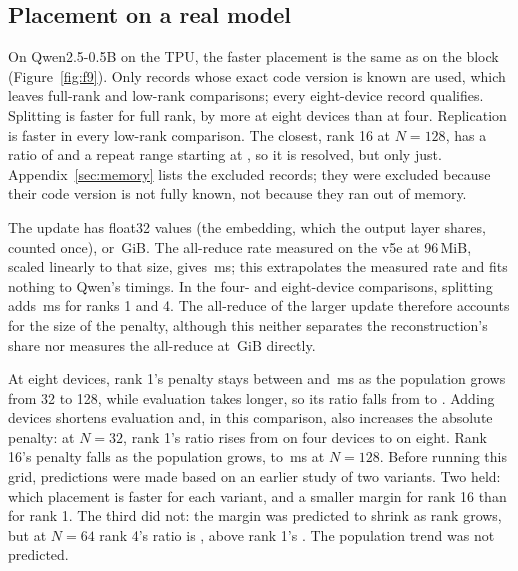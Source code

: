 \subsection{Placement on a real model}



On Qwen2.5-0.5B on the TPU, the faster placement is the same as on the block
(Figure~\ref{fig:f9}). Only records whose exact code version is known are used, which
leaves \QwenFullComparisons{} full-rank and \QwenLowComparisons{} low-rank
comparisons; every eight-device record qualifies. Splitting is faster for full rank, by more
at eight devices than at four. Replication is faster in every low-rank comparison. The
closest, rank 16 at $N=128$, has a ratio of \QwenNearTieRatio{} and a repeat range starting at
\QwenNearTieBar{}, so it is resolved, but only just. Appendix~\ref{sec:memory} lists the
excluded records; they were excluded because their code version is not fully known, not
because they ran out of memory.

The update has \QwenParams{} float32 values (the embedding, which the output layer shares,
counted once), or \QwenUpdateGiB\,GiB. The all-reduce rate measured on the v5e at 96\,MiB,
scaled linearly to that size, gives \QwenCommEstimate\,ms; this extrapolates the measured
rate and fits nothing to Qwen's timings. In the four- and eight-device comparisons,
splitting adds \QwenLowPenalty\,ms for ranks 1 and 4. The all-reduce of the larger update
therefore accounts for the size of the penalty, although this neither separates the
reconstruction's share nor measures the all-reduce at \QwenUpdateGiB\,GiB directly.

At eight devices, rank 1's penalty stays between \QwenRankOnePenaltyMin{} and
\QwenRankOnePenaltyMax\,ms as the population grows from 32 to 128, while evaluation takes
longer, so its ratio falls from \QwenRankOneRatioSmallN{} to \QwenRankOneRatioLargeN{}. Adding
devices shortens evaluation and, in this comparison, also increases the absolute penalty:
at $N=32$, rank 1's ratio rises from \QwenRankOneRatioFourDevices{} on four devices to
\QwenRankOneRatioSmallN{} on eight. Rank 16's penalty falls as the population grows, to
\QwenRankSixteenPenalty\,ms at $N=128$. Before running this grid, predictions were made based
on an earlier study of two variants. Two held: which placement is faster for each variant,
and a smaller margin for rank 16 than for rank 1. The third did not: the margin was
predicted to shrink as rank grows, but at $N=64$ rank 4's ratio is
\QwenRankFourRatioMidN{}, above rank 1's \QwenRankOneRatioMidN{}. The population trend was
not predicted.

